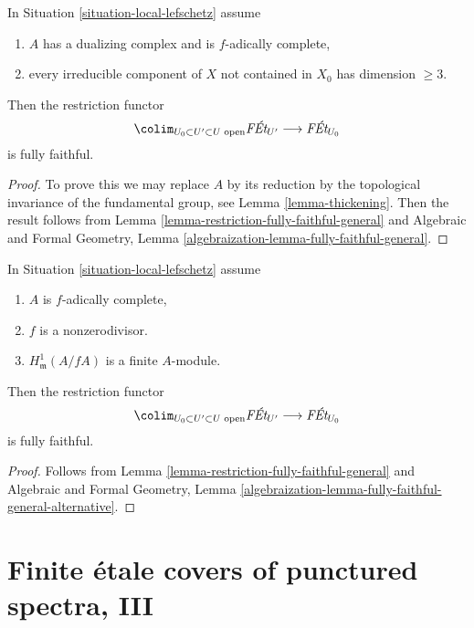 \begin{lemma}
\label{lemma-fully-faithful-general-better}
In Situation \ref{situation-local-lefschetz} assume
\begin{enumerate}
\item $A$ has a dualizing complex and is $f$-adically complete,
\item every irreducible component of $X$ not contained in $X_0$
has dimension $\geq 3$.
\end{enumerate}
Then the restriction functor
$$
\colim_{U_0 \subset U' \subset U\text{ open}} \textit{F\'Et}_{U'}
\longrightarrow
\textit{F\'Et}_{U_0}
$$
is fully faithful.
\end{lemma}

\begin{proof}
To prove this we may replace $A$ by its reduction by the topological
invariance of the fundamental group, see Lemma \ref{lemma-thickening}.
Then the result follows from
Lemma \ref{lemma-restriction-fully-faithful-general}
and Algebraic and Formal Geometry, Lemma
\ref{algebraization-lemma-fully-faithful-general}.
\end{proof}

\begin{lemma}
\label{lemma-fully-faithful-general}
In Situation \ref{situation-local-lefschetz} assume
\begin{enumerate}
\item $A$ is $f$-adically complete,
\item $f$ is a nonzerodivisor.
\item $H^1_\mathfrak m(A/fA)$ is a finite $A$-module.
\end{enumerate}
Then the restriction functor
$$
\colim_{U_0 \subset U' \subset U\text{ open}} \textit{F\'Et}_{U'}
\longrightarrow
\textit{F\'Et}_{U_0}
$$
is fully faithful.
\end{lemma}

\begin{proof}
Follows from
Lemma \ref{lemma-restriction-fully-faithful-general} and
Algebraic and Formal Geometry, Lemma
\ref{algebraization-lemma-fully-faithful-general-alternative}.
\end{proof}








\section{Finite \'etale covers of punctured spectra, III}
\label{section-pi1-punctured-spec-III}

